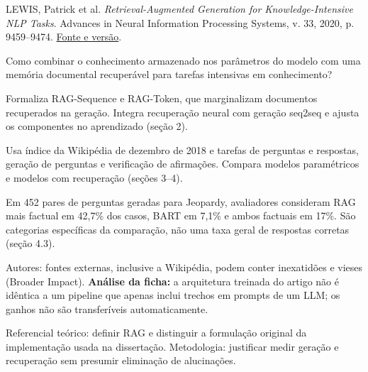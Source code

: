 {\small LEWIS, Patrick et al. \textit{Retrieval-Augmented Generation for Knowledge-Intensive NLP Tasks}. Advances in Neural Information Processing Systems, v. 33, 2020, p. 9459--9474. \href{https://proceedings.neurips.cc/paper/2020/hash/6b493230205f780e1bc26945df7481e5-Abstract.html}{Fonte e versão}.\par}

Como combinar o conhecimento armazenado nos parâmetros do modelo com uma memória documental recuperável para tarefas intensivas em conhecimento?

Formaliza RAG-Sequence e RAG-Token, que marginalizam documentos recuperados na geração. Integra recuperação neural com geração seq2seq e ajusta os componentes no aprendizado (seção 2).

Usa índice da Wikipédia de dezembro de 2018 e tarefas de perguntas e respostas, geração de perguntas e verificação de afirmações. Compara modelos paramétricos e modelos com recuperação (seções 3--4).

Em 452 pares de perguntas geradas para Jeopardy, avaliadores consideram RAG mais factual em 42,7\% dos casos, BART em 7,1\% e ambos factuais em 17\%. São categorias específicas da comparação, não uma taxa geral de respostas corretas (seção 4.3).

\begin{itemize}
\end{itemize}

Autores: fontes externas, inclusive a Wikipédia, podem conter inexatidões e vieses (Broader Impact). \textbf{Análise da ficha:} a arquitetura treinada do artigo não é idêntica a um pipeline que apenas inclui trechos em prompts de um LLM; os ganhos não são transferíveis automaticamente.

Referencial teórico: definir RAG e distinguir a formulação original da implementação usada na dissertação. Metodologia: justificar medir geração e recuperação sem presumir eliminação de alucinações.

